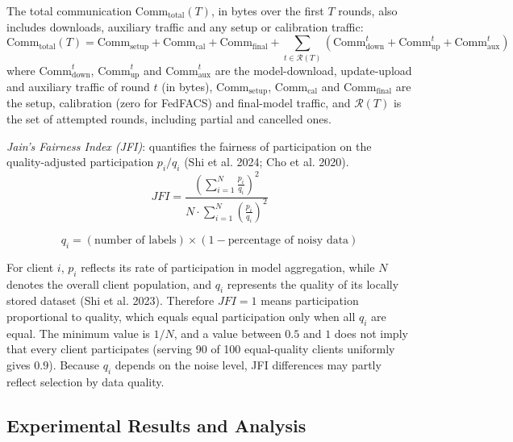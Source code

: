 \documentclass[pdflatex,sn-mathphys-num,oneside]{sn-jnl}%
\theoremstyle{thmstyleone}%
\theoremstyle{thmstyletwo}%
\theoremstyle{thmstylethree}%
\begin{document}
The total communication $\mathrm{Comm}_{\mathrm{total}}(T)$, in bytes over the first $T$ rounds, also includes downloads, auxiliary traffic and any setup or calibration traffic:
\begin{equation}
\mathrm{Comm}_{\mathrm{total}}(T)=\mathrm{Comm}_{\mathrm{setup}}+\mathrm{Comm}_{\mathrm{cal}}+\mathrm{Comm}_{\mathrm{final}}+\sum_{t\in\mathcal{R}(T)}\left(\mathrm{Comm}^t_{\mathrm{down}}+\mathrm{Comm}^t_{\mathrm{up}}+\mathrm{Comm}^t_{\mathrm{aux}}\right)
\tag{23a}
\end{equation}
where $\mathrm{Comm}^t_{\mathrm{down}}$, $\mathrm{Comm}^t_{\mathrm{up}}$ and $\mathrm{Comm}^t_{\mathrm{aux}}$ are the model-download, update-upload and auxiliary traffic of round $t$ (in bytes), $\mathrm{Comm}_{\mathrm{setup}}$, $\mathrm{Comm}_{\mathrm{cal}}$ and $\mathrm{Comm}_{\mathrm{final}}$ are the setup, calibration (zero for FedFACS) and final-model traffic, and $\mathcal{R}(T)$ is the set of attempted rounds, including partial and cancelled ones.

\textit{Jain's Fairness Index (JFI)}: quantifies the fairness of participation on the quality-adjusted participation $p_i/q_i$ (Shi et al. 2024; Cho et al. 2020).
\begin{equation}
JFI = \frac{\left(\sum_{i=1}^{N} \frac{p_i}{q_i}\right)^2}
{N \cdot \sum_{i=1}^{N} \left(\frac{p_i}{q_i}\right)^2}
\label{eq:jfi}
\end{equation}

\begin{equation}
q_i = (\text{number of labels}) \times (1 - \text{percentage of noisy data})
\label{eq:qi}
\end{equation}

For client $i$, $p_i$ reflects its rate of participation in model aggregation, while $N$ denotes the overall client population, and $q_i$ represents the quality of its locally stored dataset (Shi et al. 2023). Therefore $JFI = 1$ means participation proportional to quality, which equals equal participation only when all $q_i$ are equal. The minimum value is $1/N$, and a value between $0.5$ and $1$ does not imply that every client participates (serving 90 of 100 equal-quality clients uniformly gives $0.9$). Because $q_i$ depends on the noise level, JFI differences may partly reflect selection by data quality.

\subsection{Experimental Results and Analysis}
\end{document}
